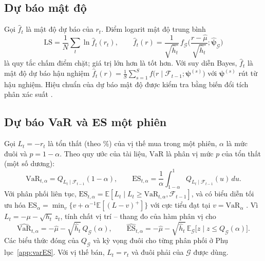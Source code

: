 \documentclass[12pt,a4paper]{article}
\theoremstyle{definition}
\theoremstyle{remark}
\newcommand{\E}{\mathbb{E}}
\newcommand{\VaR}{\mathrm{VaR}}
\newcommand{\ES}{\mathrm{ES}}
\newcommand{\LS}{\mathrm{LS}}
\newcommand{\Fcal}{\mathcal{F}}
\newcommand{\Gcal}{\mathcal{G}}
\newcommand{\bpsi}{\boldsymbol{\psi}}
\begin{document}
\subsection{Dự báo mật độ}

Gọi $\hat f_t$ là mật độ dự báo của $r_t$. Điểm logarit mật độ trung bình
\begin{equation}
\LS=\frac1N\sum_t\ln\hat f_t(r_t),\qquad
\hat f_t(r)=\frac{1}{\sqrt{\hat h_t}}\,f_{\Gcal}\Big(\frac{r-\hat\mu}{\sqrt{\hat h_t}};\hat{\bpsi}_{\Gcal}\Big)
\end{equation}
là quy tắc chấm điểm chặt; giá trị lớn hơn là tốt hơn. Với suy diễn Bayes, $\hat f_t$ là mật độ dự báo hậu nghiệm $\hat f_t(r)=\frac1{S}\sum_{s=1}^{S}f\big(r\mid\Fcal_{t-1};\bpsi^{(s)}\big)$ với $\bpsi^{(s)}$ rút từ hậu nghiệm. Hiệu chuẩn của dự báo mật độ được kiểm tra bằng biến đổi tích phân xác suất \cite{dgt1998,berkowitz2001}.

\subsection{Dự báo VaR và ES một phiên}

Gọi $L_t=-r_t$ là tổn thất (theo \%) của vị thế mua trong một phiên, $\alpha$ là mức đuôi và $p=1-\alpha$. Theo quy ước của tài liệu, $\VaR$ là phân vị mức $p$ của tổn thất (một số dương):
\begin{equation}
\VaR_{t,\alpha}=Q_{L_t\mid\Fcal_{t-1}}(1-\alpha),\qquad
\ES_{t,\alpha}=\frac1\alpha\int_{1-\alpha}^{1}Q_{L_t\mid\Fcal_{t-1}}(u)\,du .
\end{equation}
Với phân phối liên tục, $\ES_{t,\alpha}=\E[L_t\mid L_t\ge\VaR_{t,\alpha},\Fcal_{t-1}]$, và có biểu diễn tối ưu hóa $\ES_\alpha=\min_v\{v+\alpha^{-1}\E[(L-v)^+]\}$ với cực tiểu đạt tại $v=\VaR_\alpha$ \cite{rockafellar2000}. Vì $L_t=-\mu-\sqrt{h_t}\,z_t$, tính chất vị trí -- thang đo của hàm phân vị cho
\begin{equation}\label{eq:var1}
\widehat{\VaR}_{t,\alpha}=-\hat\mu-\sqrt{\hat h_t}\,Q_{\Gcal}(\alpha),\qquad
\widehat{\ES}_{t,\alpha}=-\hat\mu-\sqrt{\hat h_t}\,\E_{\Gcal}\big[z\mid z\le Q_{\Gcal}(\alpha)\big].
\end{equation}
Các biểu thức đóng của $Q_{\Gcal}$ và kỳ vọng đuôi cho từng phân phối ở Phụ lục~\ref{app:varES}. Với vị thế bán, $L_t=r_t$ và đuôi phải của $\Gcal$ được dùng.
\end{document}
